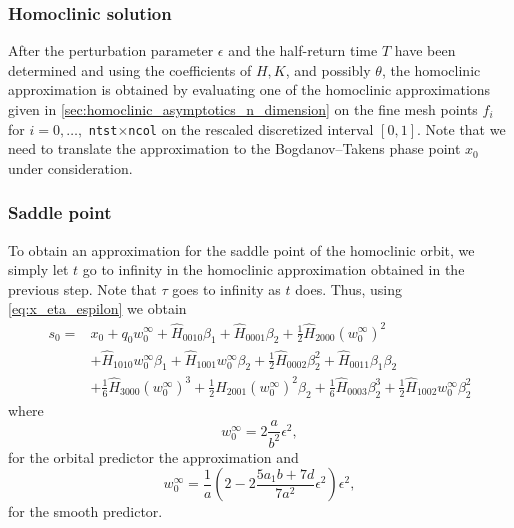 \subsubsection{Homoclinic solution}
After the perturbation parameter $\epsilon$ and the half-return time $T$ have
been determined and using the coefficients of $H,K$, and possibly $\theta$, the
homoclinic approximation is obtained by evaluating one of the homoclinic
approximations given in \cref{sec:homoclinic_asymptotics_n_dimension} on the
fine mesh points $f_i$ for $i=0,\dots,$ \texttt{ntst}$\times$\texttt{ncol} on the
rescaled discretized interval $[0,1]$.  Note that we need to translate the
approximation to the Bogdanov--Takens phase point $x_0$ under consideration.

\subsubsection{Saddle point}
To obtain an approximation for the saddle point of the homoclinic orbit, we
simply let $t$ go to infinity in the homoclinic approximation obtained in the
previous step. Note that $\tau$ goes to infinity as $t$ does. Thus, using
\cref{eq:x_eta_espilon} we obtain
\begin{equation*}
\begin{aligned}
    s_0 ={}& x_0 + q_0 w_0^{\infty} + \hat H_{0010} \beta_1 + \hat H_{0001} \beta_2 +
            \frac{1}{2} \hat H_{2000} \left(w_0^{\infty}\right)^2  \\
           & + \hat H_{1010} w_0^{\infty} \beta_1 + \hat H_{1001} w_0^{\infty} \beta_2 +
             \frac{1}{2} \hat H_{0002} \beta_2^2 + \hat H_{0011} \beta_1 \beta_2 \\
           & + \frac{1}{6} \hat H_{3000} \left(w_0^{\infty}\right)^3 +
             \frac{1}{2} \hat H_{2001} \left(w_0^{\infty}\right)^2 \beta_2 
             + \frac{1}{6} \hat H_{0003} \beta_2^3 + \frac{1}{2} \hat H_{1002} w_0^{\infty} \beta_2^2
\end{aligned}
\end{equation*}
where
\[
  w_0^\infty = 2\frac{a}{b^2} \epsilon^2,
\] 
for the orbital predictor the approximation and
\[
    w_0^\infty = \frac1a \left( 2 - 2 \frac{5 a_1 b + 7 d}{7a^2} \epsilon^2
    \right) \epsilon^2,
\] 
for the smooth predictor.

